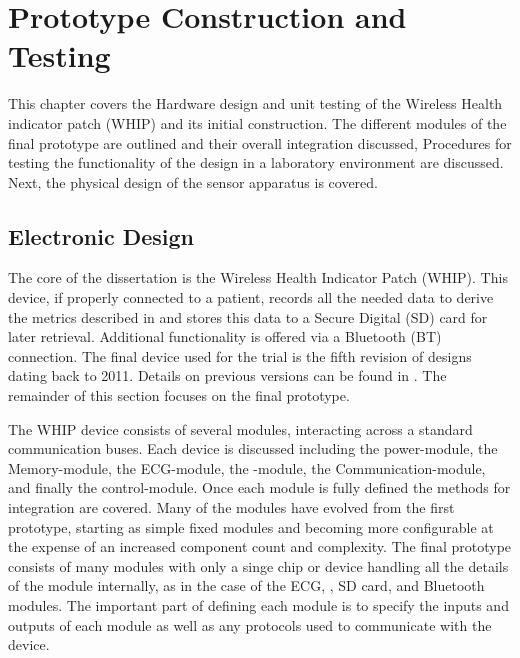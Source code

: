 \chapter{Prototype Construction and Testing}
\label{chap:ProtoTypeBuildTest}


This chapter covers the Hardware design and unit testing of the Wireless Health indicator patch (WHIP) and its initial construction. The different modules of the final prototype are outlined and their overall integration discussed, Procedures for testing the functionality of the design in a laboratory environment are discussed. Next, the physical design of the sensor apparatus is covered.

\section{Electronic Design}


The core of the dissertation is the Wireless Health Indicator Patch (WHIP). This device, if properly connected to a patient, records all the needed data to derive the metrics described in  and stores this data to a Secure Digital (SD) card for later retrieval. Additional functionality is offered via a Bluetooth (BT) connection. The final device used for the trial is the fifth revision of designs dating back to 2011. Details on previous versions can be found in . The remainder of this section focuses on the final prototype.

The WHIP device consists of several modules, interacting across a standard communication buses. Each device is discussed including the power-module, the Memory-module, the ECG-module, the -module, the Communication-module, and finally the control-module. Once each module is fully defined the methods for integration are covered. Many of the modules have evolved from the first prototype, starting as simple fixed modules and becoming more configurable at the expense of an increased component count and complexity. The final prototype consists of many modules with only a singe chip or device handling all the details of the module internally, as in the case of the ECG, , SD card, and Bluetooth modules. The important part of defining each module is to specify the inputs and outputs of each module as well as any protocols used to communicate with the device.

